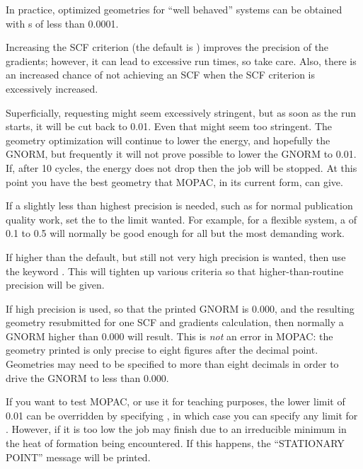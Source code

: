 In practice, optimized geometries for ``well behaved'' systems can be obtained
with s of less than 0.0001.

Increasing the SCF criterion (the default is ) improves the
precision of the gradients; however, it can lead to excessive run times, so
take care.  Also, there is an increased chance of  not  achieving  an SCF when
the SCF criterion is excessively increased.

Superficially, requesting    might  seem  excessively stringent, 
but  as soon as the run starts, it will be cut back to 0.01. Even that might
seem too  stringent.   The  geometry  optimization  will continue to lower the
energy, and hopefully the GNORM, but frequently it will not prove possible to
lower  the   GNORM to  0.01.   If,  after  10 cycles,  the energy does not drop
then the job will be stopped.  At this point you have the best geometry that
MOPAC, in its  current  form,  can give.

If a slightly less than highest precision is needed,  such  as  for normal
publication quality work, set the  to the limit wanted.  For
example, for a flexible system, a  of 0.1 to 0.5 will  normally  be
good enough for all but the most demanding work.

If higher than the default, but still not very  high  precision  is wanted, 
then  use  the  keyword  .  This will tighten up various criteria
so that higher-than-routine precision will be given.

If high precision is used, so that the printed  GNORM is 0.000,  and the  
resulting   geometry   resubmitted   for  one  SCF  and  gradients calculation,
then normally a  GNORM higher than 0.000 will result.   This is  {\em not}  an
error in MOPAC:  the geometry printed is only precise to eight figures after
the decimal point.  Geometries may need  to  be  specified  to more than eight
decimals in order to drive the  GNORM to less than 0.000.

If you want to test MOPAC, or use it  for  teaching  purposes,  the
  lower limit of 0.01 can be overridden by specifying ,
in which case you can specify any limit for .  However, if it is
too low the job  may  finish  due to an irreducible minimum in the heat of
formation being encountered.  If this happens, the ``STATIONARY POINT'' message
will be printed.

